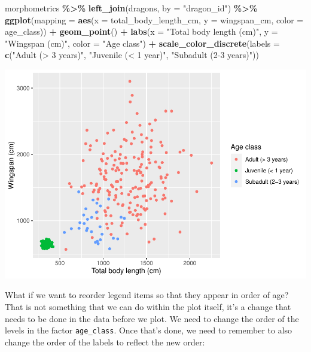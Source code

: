 \documentclass[
]{book}
\newenvironment{Shaded}{\begin{snugshade}}{\end{snugshade}}
\newcommand{\AttributeTok}[1]{\textcolor[rgb]{0.13,0.29,0.53}{#1}}
\newcommand{\FunctionTok}[1]{\textcolor[rgb]{0.13,0.29,0.53}{\textbf{#1}}}
\newcommand{\NormalTok}[1]{#1}
\newcommand{\SpecialCharTok}[1]{\textcolor[rgb]{0.81,0.36,0.00}{\textbf{#1}}}
\newcommand{\StringTok}[1]{\textcolor[rgb]{0.31,0.60,0.02}{#1}}
\begin{document}
\begin{Shaded}
\begin{Highlighting}[]
\NormalTok{morphometrics }\SpecialCharTok{\%\textgreater{}\%} 
  \FunctionTok{left\_join}\NormalTok{(dragons, }\AttributeTok{by =} \StringTok{"dragon\_id"}\NormalTok{) }\SpecialCharTok{\%\textgreater{}\%} 
\FunctionTok{ggplot}\NormalTok{(}\AttributeTok{mapping =} \FunctionTok{aes}\NormalTok{(}\AttributeTok{x =}\NormalTok{ total\_body\_length\_cm, }\AttributeTok{y =}\NormalTok{ wingspan\_cm, }\AttributeTok{color =}\NormalTok{ age\_class)) }\SpecialCharTok{+}
  \FunctionTok{geom\_point}\NormalTok{() }\SpecialCharTok{+}
  \FunctionTok{labs}\NormalTok{(}\AttributeTok{x =} \StringTok{"Total body length (cm)"}\NormalTok{, }\AttributeTok{y =} \StringTok{"Wingspan (cm)"}\NormalTok{, }\AttributeTok{color =} \StringTok{"Age class"}\NormalTok{) }\SpecialCharTok{+}
  \FunctionTok{scale\_color\_discrete}\NormalTok{(}\AttributeTok{labels =} \FunctionTok{c}\NormalTok{(}\StringTok{"Adult (\textgreater{} 3 years)"}\NormalTok{,}
                                 \StringTok{"Juvenile (\textless{} 1 year)"}\NormalTok{,}
                                 \StringTok{"Subadult (2{-}3 years)"}\NormalTok{))}
\end{Highlighting}
\end{Shaded}

\includegraphics{reproducible-science_files/figure-latex/gg10-1.pdf}

What if we want to reorder legend items so that they appear in order of age?
That is not something that we can do within the plot itself, it's a change that
needs to be done in the data before we plot. We need to change the order of the
levels in the factor \texttt{age\_class}. Once that's done, we need to remember to also
change the order of the labels to reflect the new order:
\end{document}
